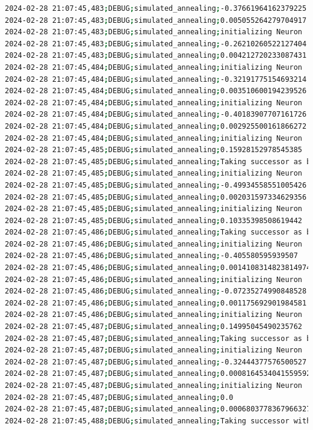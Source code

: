 \documentclass{article}
\begin{document}
\begin{lstlisting}[language=bash, caption=Example Output of Program]
2024-02-28 21:07:45,483;DEBUG;simulated_annealing;-0.37661964162379225
2024-02-28 21:07:45,483;DEBUG;simulated_annealing;0.005055264279704917
2024-02-28 21:07:45,483;DEBUG;simulated_annealing;initializing Neuron
2024-02-28 21:07:45,483;DEBUG;simulated_annealing;-0.26210260522127404
2024-02-28 21:07:45,483;DEBUG;simulated_annealing;0.004212720233087431
2024-02-28 21:07:45,484;DEBUG;simulated_annealing;initializing Neuron
2024-02-28 21:07:45,484;DEBUG;simulated_annealing;-0.32191775154693214
2024-02-28 21:07:45,484;DEBUG;simulated_annealing;0.003510600194239526
2024-02-28 21:07:45,484;DEBUG;simulated_annealing;initializing Neuron
2024-02-28 21:07:45,484;DEBUG;simulated_annealing;-0.40183907707161726
2024-02-28 21:07:45,484;DEBUG;simulated_annealing;0.002925500161866272
2024-02-28 21:07:45,484;DEBUG;simulated_annealing;initializing Neuron
2024-02-28 21:07:45,485;DEBUG;simulated_annealing;0.15928152978545385
2024-02-28 21:07:45,485;DEBUG;simulated_annealing;Taking successor as better option (exploitation)
2024-02-28 21:07:45,485;DEBUG;simulated_annealing;initializing Neuron
2024-02-28 21:07:45,485;DEBUG;simulated_annealing;-0.49934558551005426
2024-02-28 21:07:45,485;DEBUG;simulated_annealing;0.002031597334629356
2024-02-28 21:07:45,485;DEBUG;simulated_annealing;initializing Neuron
2024-02-28 21:07:45,485;DEBUG;simulated_annealing;0.10335398508619442
2024-02-28 21:07:45,486;DEBUG;simulated_annealing;Taking successor as better option (exploitation)
2024-02-28 21:07:45,486;DEBUG;simulated_annealing;initializing Neuron
2024-02-28 21:07:45,486;DEBUG;simulated_annealing;-0.405580595939507
2024-02-28 21:07:45,486;DEBUG;simulated_annealing;0.0014108314823814974
2024-02-28 21:07:45,486;DEBUG;simulated_annealing;initializing Neuron
2024-02-28 21:07:45,486;DEBUG;simulated_annealing;-0.07235274990848528
2024-02-28 21:07:45,486;DEBUG;simulated_annealing;0.001175692901984581
2024-02-28 21:07:45,486;DEBUG;simulated_annealing;initializing Neuron
2024-02-28 21:07:45,487;DEBUG;simulated_annealing;0.14995045490235762
2024-02-28 21:07:45,487;DEBUG;simulated_annealing;Taking successor as better option (exploitation)
2024-02-28 21:07:45,487;DEBUG;simulated_annealing;initializing Neuron
2024-02-28 21:07:45,487;DEBUG;simulated_annealing;-0.32444377576500527
2024-02-28 21:07:45,487;DEBUG;simulated_annealing;0.0008164534041559592
2024-02-28 21:07:45,487;DEBUG;simulated_annealing;initializing Neuron
2024-02-28 21:07:45,487;DEBUG;simulated_annealing;0.0
2024-02-28 21:07:45,487;DEBUG;simulated_annealing;0.0006803778367966327
2024-02-28 21:07:45,488;DEBUG;simulated_annealing;Taking successor with probability 100% (exploration)

\end{lstlisting}
\end{document}
